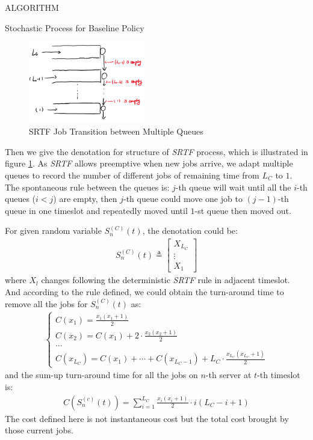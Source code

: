 \documentclass[10pt, conference, letterpaper]{IEEEtran}
\begin{document}
\begin{section}{ALGORITHM}
\begin{subsection}{Stochastic Process for Baseline Policy}
            \begin{figure}[h]
                \centering
                \includegraphics[width=0.45\textwidth]{srtf-graph.png}
                \caption{SRTF Job Transition between Multiple Queues}
                \label{fig:srtf}
            \end{figure}
            Then we give the denotation for structure of \emph{SRTF} process, which is illustrated in figure \ref{fig:srtf}. As \emph{SRTF} allows preemptive when new jobs arrive, we adapt multiple queues to record the number of different jobs of remaining time from $L_C$ to $1$. The spontaneous rule between the queues is: $j$-th queue will wait until all the $i$-th queues ($i < j$) are empty, then $j$-th queue could move one job to $(j-1)$-th queue in one timeslot and repeatedly moved until $1$-st queue then moved out.

            For given random variable $S^{(C)}_{n}(t)$, the denotation could be:
            \begin{align}
                S^{(C)}_{n}(t) \triangleq \begin{bmatrix}
                    X_{L_C} \\ \vdots \\X_{1}
                \end{bmatrix}
            \end{align}
            where $X_{l}$ changes following the deterministic \emph{SRTF} rule in adjacent timeslot. And according to the rule defined, we could obtain the turn-around time to remove all the jobs for $S^{(C)}_{n}(t)$ as:
            \begin{align}
                \begin{cases}
                    C(x_{1}) = \frac{x_1(x_1+1)}{2}
                    \\
                    C(x_{2}) = C(x_{1}) + 2 \cdot \frac{x_2(x_2+1)}{2}
                    \\
                    \dots
                    \\
                    C(x_{L_C}) = C(x_{1}) + \cdots + C(x_{L_C-1}) + L_C \cdot \frac{x_{L_C}(x_{L_C}+1)}{2}
                \end{cases}
            \end{align}
            and the sum-up turn-around time for all the jobs on $n$-th server at $t$-th timeslot is:
            \begin{align}
                C(S^{(c)}_{n}(t)) = \sum_{i=1}^{L_C} \frac{x_i(x_i+1)}{2} \cdot i(L_C-i+1)
            \end{align}
            The cost defined here is not instantaneous cost but the total cost brought by those current jobs.


\end{subsection}
\end{section}
\end{document}

